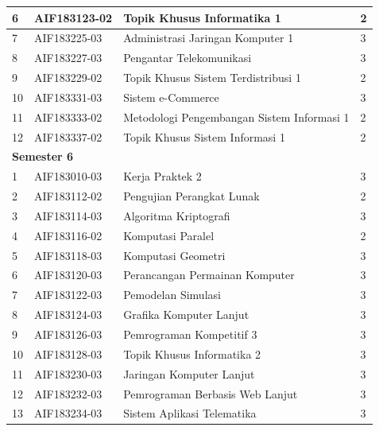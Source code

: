 \begin{table}[H]
\begin{tabular}{|p{0.5cm}|p{2.85cm}|p{4.95cm}|p{2.7cm}|}
6   & AIF183123-02    & Topik Khusus Informatika 1                 & 2   \\ \hline
7   & AIF183225-03    & Administrasi Jaringan Komputer 1           & 3   \\ \hline
8   & AIF183227-03    & Pengantar Telekomunikasi                   & 3   \\ \hline
9   & AIF183229-02    & Topik Khusus Sistem Terdistribusi 1        & 2   \\ \hline
			10  & AIF183331-03    & Sistem e-Commerce                          & 3   \\ \hline
11  & AIF183333-02    & Metodologi Pengembangan Sistem Informasi 1 & 2   \\ \hline
12  & AIF183337-02    & Topik Khusus Sistem Informasi 1            & 2   \\ \hline
\multicolumn{4}{|l|}{\textbf{Semester 6}}                                \\ \hline
1   & AIF183010-03    & Kerja Praktek 2                            & 3   \\ \hline
2   & AIF183112-02    & Pengujian Perangkat Lunak                  & 2   \\ \hline
3   & AIF183114-03    & Algoritma Kriptografi                      & 3   \\ \hline
4   & AIF183116-02    & Komputasi Paralel                          & 2   \\ \hline
5   & AIF183118-03    & Komputasi Geometri                         & 3   \\ \hline
6   & AIF183120-03    & Perancangan Permainan Komputer             & 3   \\ \hline
7   & AIF183122-03    & Pemodelan Simulasi                         & 3   \\ \hline
8   & AIF183124-03    & Grafika Komputer Lanjut                    & 3   \\ \hline
9   & AIF183126-03    & Pemrograman Kompetitif 3                   & 3   \\ \hline
10  & AIF183128-03    & Topik Khusus Informatika 2                 & 3   \\ \hline
11  & AIF183230-03    & Jaringan Komputer Lanjut                   & 3   \\ \hline
12  & AIF183232-03    & Pemrograman Berbasis Web Lanjut            & 3   \\ \hline
13  & AIF183234-03    & Sistem Aplikasi Telematika                 & 3   \\ \hline
		\end{tabular}
	\label{tab:kuliahpilihan}
\end{table}

